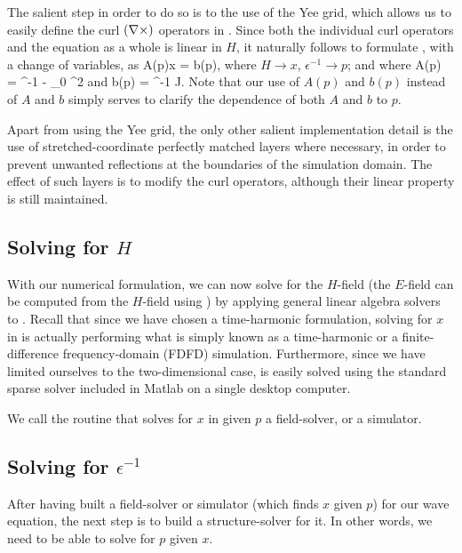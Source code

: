 The salient step in order to do so
    is to the use of the Yee grid\cite{yee}, 
    which allows us to easily define the curl $(\nabla\times)$
    operators in . 
Since both the individual curl operators and the equation as a whole
    is linear in $H$, it naturally follows to formulate ,
    with a change of variables, as
\BE A(p)x = b(p), \label{eq:Ab} \EE 
    where $H \to x$, $\epsilon^{-1} \to p$; 
    and where
\BE A(p) = \curl \epsilon^{-1} \curl - \mu_0 \omega^2 \EE 
    and
\BE b(p) = \curl \epsilon^{-1} J. \EE
Note that our use of $A(p)$ and $b(p)$ instead of $A$ and $b$
    simply serves to clarify the dependence
    of both $A$ and $b$ to $p$.

Apart from using the Yee grid, the only other salient implementation detail
    is the use of
    stretched-coordinate perfectly matched layers \cite{pml}
    where necessary, in order to prevent unwanted reflections
    at the boundaries of the simulation domain.
The effect of such layers is to modify the curl operators,
    although their linear property is still maintained.

\subsection{Solving for $H$}
With our numerical formulation, we can now solve for the $H$-field
    (the $E$-field can be computed from the $H$-field using )
    by applying general linear algebra solvers to .
Recall that since we have chosen a time-harmonic formulation,
    solving for $x$ in  is actually performing what is simply known as
    a time-harmonic or a finite-difference frequency-domain (FDFD) simulation\cite{shin}. 
Furthermore, since we have limited ourselves to the two-dimensional case,
     is easily solved using the standard sparse solver
    included in Matlab on a single desktop computer.

We call the routine that solves for $x$ in  given $p$ a field-solver,
    or a simulator.
    


\subsection{Solving for $\epsilon^{-1}$}
    After having built a field-solver or simulator
    (which finds $x$ given $p$) for our wave equation,
    the next step is to build a structure-solver for it.
In other words, we need to be able to solve for $p$ given $x$.

